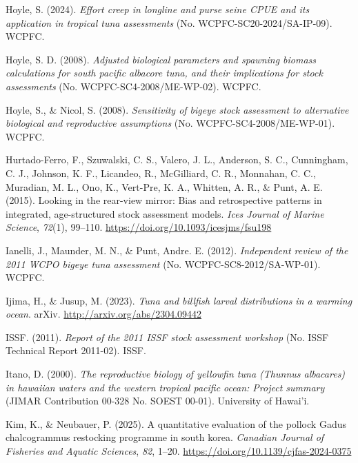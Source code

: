 \documentclass[
  english,
  a4paper,
  a4paper,
  11pt]{SCreport}
\newlength{\cslhangindent}
\newenvironment{CSLReferences}[2] %
 {\begin{list}{}{%
  \setlength{\itemindent}{0pt}
  \setlength{\leftmargin}{0pt}
  \setlength{\parsep}{0pt}
  \ifodd #1
   \setlength{\leftmargin}{\cslhangindent}
   \setlength{\itemindent}{-1\cslhangindent}
  \fi
  \setlength{\itemsep}{#2\baselineskip}}}
 {\end{list}}
\begin{document}
\begin{CSLReferences}{1}{0}
Hoyle, S. (2024). \emph{Effort creep in longline and purse seine {CPUE}
and its application in tropical tuna assessments} (No.
{WCPFC}-{SC}20-2024/{SA}-{IP}-09). WCPFC.

Hoyle, S. D. (2008). \emph{Adjusted biological parameters and spawning
biomass calculations for south pacific albacore tuna, and their
implications for stock assessments} (No.
{WCPFC}-{SC}4-2008/{ME}-{WP}-02). WCPFC.

Hoyle, S., \& Nicol, S. (2008). \emph{Sensitivity of bigeye stock
assessment to alternative biological and reproductive assumptions} (No.
{WCPFC}-{SC}4-2008/{ME}-{WP}-01). WCPFC.

Hurtado-Ferro, F., Szuwalski, C. S., Valero, J. L., Anderson, S. C.,
Cunningham, C. J., Johnson, K. F., Licandeo, R., McGilliard, C. R.,
Monnahan, C. C., Muradian, M. L., Ono, K., Vert-Pre, K. A., Whitten, A.
R., \& Punt, A. E. (2015). Looking in the rear-view mirror: Bias and
retrospective patterns in integrated, age-structured stock assessment
models. \emph{Ices Journal of Marine Science}, \emph{72}(1), 99--110.
\url{https://doi.org/10.1093/icesjms/fsu198}

Ianelli, J., Maunder, M. N., \& Punt, Andre. E. (2012).
\emph{Independent review of the 2011 {WCPO} bigeye tuna assessment} (No.
{WCPFC}-{SC}8-2012/{SA}-{WP}-01). WCPFC.

Ijima, H., \& Jusup, M. (2023). \emph{Tuna and billfish larval
distributions in a warming ocean}. {arXiv}.
\url{http://arxiv.org/abs/2304.09442}

ISSF. (2011). \emph{Report of the 2011 {ISSF} stock assessment workshop}
(No. {ISSF} Technical Report 2011-02). ISSF.

Itano, D. (2000). \emph{The reproductive biology of yellowfin tuna
({\emph{Thunnus albacares}}) in hawaiian waters and the western tropical
pacific ocean: Project summary} (JIMAR Contribution 00-328 No. {SOEST}
00-01). University of Hawai'i.

Kim, K., \& Neubauer, P. (2025). A quantitative evaluation of the
pollock {Gadus chalcogrammus} restocking programme in south korea.
\emph{Canadian Journal of Fisheries and Aquatic Sciences}, \emph{82},
1--20. \url{https://doi.org/10.1139/cjfas-2024-0375}


\end{CSLReferences}
\end{document}
